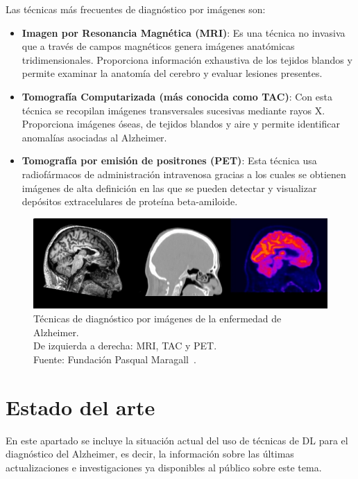 Las técnicas más frecuentes de diagnóstico por imágenes son:
\begin{itemize}
    \item \textbf{Imagen por Resonancia Magnética (MRI)}: Es una técnica no invasiva que a través de campos magnéticos
    genera imágenes anatómicas tridimensionales.
    Proporciona información exhaustiva de los tejidos blandos y permite examinar la anatomía del cerebro y evaluar
    lesiones presentes.
    \item \textbf{Tomografía Computarizada (más conocida como TAC)}: Con esta técnica se recopilan imágenes transversales
    sucesivas mediante rayos X. Proporciona imágenes óseas, de tejidos blandos y aire y permite identificar anomalías
    asociadas al Alzheimer.
    \item \textbf{Tomografía por emisión de positrones (PET)}: Esta técnica usa radiofármacos de administración intravenosa
    gracias a los cuales se obtienen imágenes de alta definición en las que se pueden detectar y visualizar depósitos
    extracelulares de proteína beta-amiloide.\\
\end{itemize}

\begin{figure}[H]
    \centering
    \includegraphics[width=\textwidth]{./imgs/MRI-TAC-PET}
    \caption{Técnicas de diagnóstico por imágenes de la enfermedad de Alzheimer.\\ De izquierda a derecha: MRI, TAC y PET.
    \\Fuente: Fundación Pasqual Maragall~\cite{img-mri-tac-pet}.}
    \label{fig:tecnicas-diagnosico-imagen}
\end{figure}




\section{Estado del arte}\label{sec:estado-del-arte}
En este apartado se incluye la situación actual del uso de técnicas de DL para el diagnóstico del Alzheimer, es decir,
la información sobre las últimas actualizaciones e investigaciones ya disponibles al público sobre este tema.

